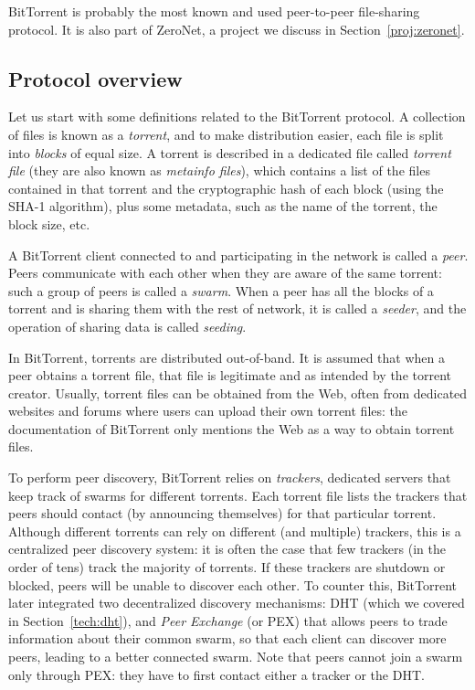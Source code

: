 \documentclass[mscthesis]{usiinfthesis}
\begin{document}
BitTorrent is probably the most known and used peer-to-peer file-sharing protocol. It is also part of ZeroNet, a project we discuss in Section~\ref{proj:zeronet}.

\subsection{Protocol overview}

Let us start with some definitions related to the BitTorrent protocol. A collection of files is known as a \emph{torrent}, and to make distribution easier, each file is split into \emph{blocks} of equal size. A torrent is described in a dedicated file called \emph{torrent file} (they are also known as \textit{metainfo files}), which contains a list of the files contained in that torrent and the cryptographic hash of each block (using the SHA-1 algorithm), plus some metadata, such as the name of the torrent, the block size, etc.

A BitTorrent client connected to and participating in the network is called a \emph{peer}. Peers communicate with each other when they are aware of the same torrent: such a group of peers is called a \emph{swarm}. When a peer has all the blocks of a torrent and is sharing them with the rest of network, it is called a \emph{seeder}, and the operation of sharing data is called \textit{seeding}.

In BitTorrent, torrents are distributed out-of-band. It is assumed that when a peer obtains a torrent file, that file is legitimate and as intended by the torrent creator. Usually, torrent files can be obtained from the Web, often from dedicated websites and forums where users can upload their own torrent files: the documentation of BitTorrent only mentions the Web as a way to obtain torrent files.

To perform peer discovery, BitTorrent relies on \emph{trackers}, dedicated servers that keep track of swarms for different torrents. Each torrent file lists the trackers that peers should contact (by announcing themselves) for that particular torrent. Although different torrents can rely on different (and multiple) trackers, this is a centralized peer discovery system: it is often the case that few trackers (in the order of tens) track the majority of torrents. If these trackers are shutdown or blocked, peers will be unable to discover each other. To counter this, BitTorrent later integrated two decentralized discovery mechanisms: DHT (which we covered in Section~\ref{tech:dht}), and \emph{Peer Exchange} (or PEX) that allows peers to trade information about their common swarm, so that each client can discover more peers, leading to a better connected swarm. Note that peers cannot join a swarm only through PEX: they have to first contact either a tracker or the DHT.
\end{document}
